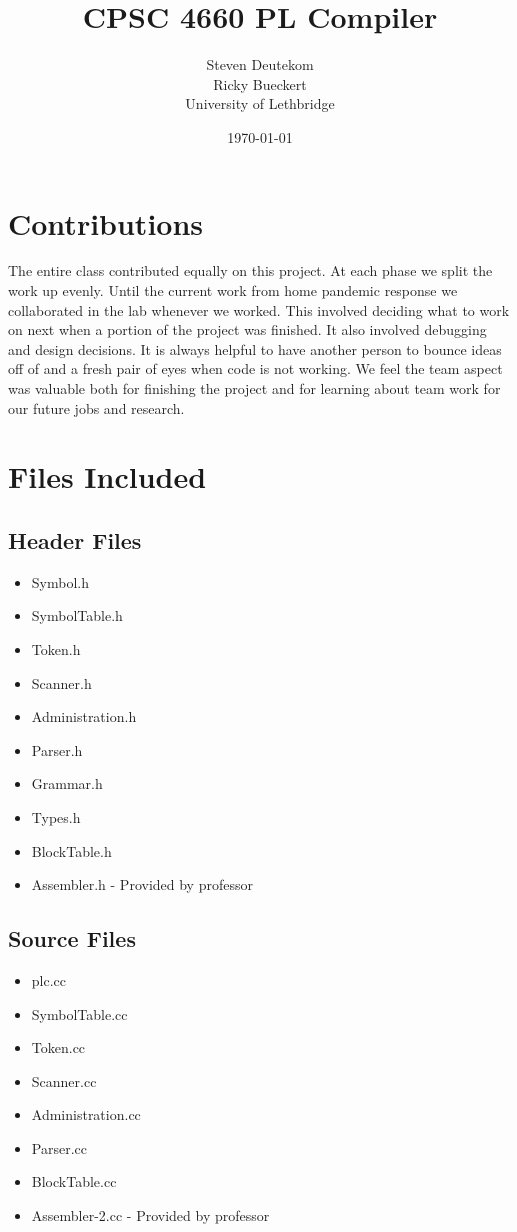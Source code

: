 \documentclass{article}
\begin{document}
\title{CPSC 4660 PL Compiler}
\author{Steven Deutekom\\
	Ricky Bueckert\\
	University of Lethbridge}
\date{\today}

\maketitle

\section{Contributions}
The entire class contributed equally on this project. At each phase we split
the work up evenly. Until the current work from home pandemic response we
collaborated in the lab whenever we worked. This involved deciding what to
work on next when a portion of the project was finished. It also involved
debugging and design decisions. It is always helpful to have another person
to bounce ideas off of and a fresh pair of eyes when code is not working. We
feel the team aspect was valuable both for finishing the project and for learning
about team work for our future jobs and research.

\section{Files Included}

\subsection{Header Files}
\begin{itemize}
  \item Symbol.h
  \item SymbolTable.h
  \item Token.h
  \item Scanner.h
  \item Administration.h
  \item Parser.h
  \item Grammar.h
  \item Types.h
  \item BlockTable.h
  \item Assembler.h - Provided by professor
\end{itemize}

\subsection{Source Files}
\begin{itemize}
  \item plc.cc
  \item SymbolTable.cc
  \item Token.cc
  \item Scanner.cc
  \item Administration.cc
  \item Parser.cc
  \item BlockTable.cc
  \item Assembler-2.cc - Provided by professor
\end{itemize}
\end{document}
